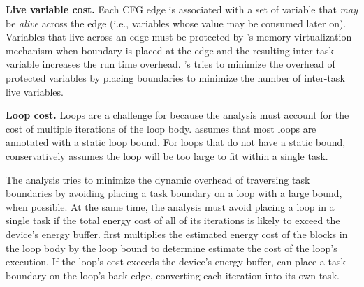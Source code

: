 {\noindent \bf Live variable cost.} Each CFG edge is associated with a set of variable that {\em may} be {\em alive} across the edge (i.e., variables whose value may be consumed later on). Variables that live across an edge must be protected by \sys's memory virtualization mechanism when boundary is placed at the edge and the resulting inter-task variable increases the run time overhead. \sys's tries to minimize the overhead of protected variables by placing boundaries to minimize the number of inter-task live variables.

{\noindent \bf Loop cost.} Loops are a challenge for \sys because the analysis must account for the cost of multiple iterations of the loop body. \sys assumes that most loops are
annotated with a static loop bound. For loops that do not have a static bound, \sys conservatively assumes the loop will be too large to fit within a single task.


The analysis tries to minimize the dynamic overhead of traversing task boundaries by avoiding placing a task boundary on a loop with a large bound, when possible. At the same time, the analysis must avoid placing a loop in a single task if the total energy cost of all of its iterations is likely to exceed the device's energy buffer. \sys first multiplies the estimated energy cost of the blocks in the loop body by the loop bound to determine estimate the cost of the loop's execution. If the loop's cost exceeds the device's energy buffer, \sys can place a task boundary on the loop's back-edge, converting each iteration into its own task.  



